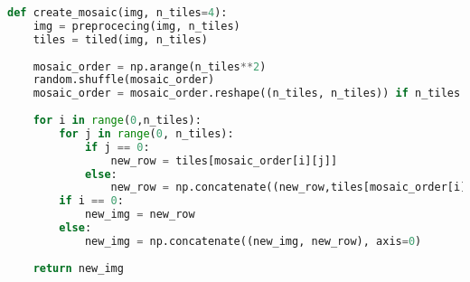 \documentclass[journal]{IEEEtran}
\begin{document}
\begin{lstlisting}[language=Python, caption=Create mosaic function, label=list:create_mosaic]
def create_mosaic(img, n_tiles=4):
	img = preprocecing(img, n_tiles)
	tiles = tiled(img, n_tiles)
	
	mosaic_order = np.arange(n_tiles**2)
	random.shuffle(mosaic_order)
	mosaic_order = mosaic_order.reshape((n_tiles, n_tiles)) if n_tiles != 4 else np.array([5, 10, 12, 2, 7, 15, 0, 8, 11, 13, 1, 6, 3, 14, 9, 4]).reshape((n_tiles, n_tiles))
	
	for i in range(0,n_tiles):
		for j in range(0, n_tiles):
			if j == 0:
				new_row = tiles[mosaic_order[i][j]]
			else:
				new_row = np.concatenate((new_row,tiles[mosaic_order[i][j]]), axis=1)
		if i == 0:
			new_img = new_row
		else:
			new_img = np.concatenate((new_img, new_row), axis=0)
	
	return new_img
\end{lstlisting}
\end{document}
